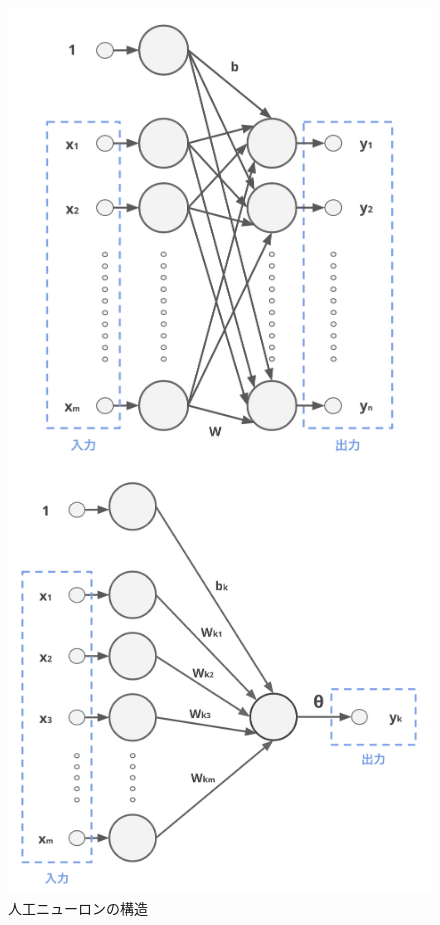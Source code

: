 \begin{figure}[b]
\begin{center}
\begin{minipage}{0.5\hsize}
\begin{center}
\includegraphics[width=\hsize]{figure/neuron1.png}
\caption{人工ニューロンの構造}
\label{fig:neuron1}
\end{center}
\end{minipage}
\begin{minipage}{0.45\hsize}
\begin{center}
\includegraphics[width=\hsize]{figure/neuron2.png}

\end{center}
\end{minipage}
\end{center}
\end{figure}
